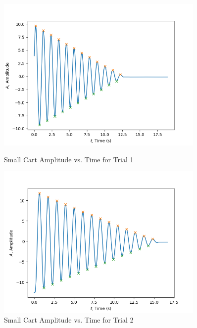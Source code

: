 \begin{figure}[H]
    \centering
    \begin{minipage}{0.45\textwidth}
        \centering
        \includegraphics[width=0.9\textwidth]{Sections/Figures/damping_ratio_small_cart_1.png}
        \caption{Small Cart Amplitude vs. Time for Trial 1}
        \label{fig:Small Cart Amplitude vs. Time Trial 1}
    \end{minipage}\qquad
    \begin{minipage}{0.45\textwidth}
        \centering
        \includegraphics[width=0.9\textwidth]{Sections/Figures/damping_ratio_small_cart_2.png}
        \caption{Small Cart Amplitude vs. Time for Trial 2}
        \label{fig:Small Cart Amplitude vs. Time Trial 2}
    \end{minipage}
\end{figure}
